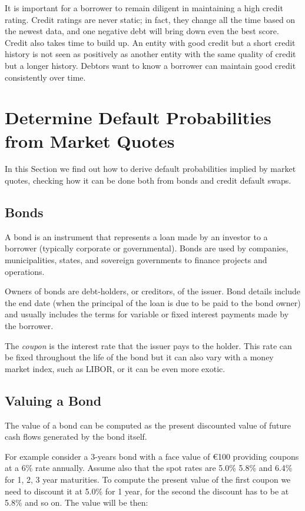 It is important for a borrower to remain diligent in maintaining a high
credit rating. Credit ratings are never static; in fact, they change all
the time based on the newest data, and one negative debt will bring down
even the best score. 
Credit also takes time to build up. An entity with
good credit but a short credit history is not seen as positively as
another entity with the same quality of credit but a longer history.
Debtors want to know a borrower can maintain good credit consistently
over time.

\section{Determine Default Probabilities from Market Quotes}
In this Section we find out how to derive default probabilities implied by market quotes, checking how it can be done both from bonds and credit default swaps.

\subsection{Bonds}\label{bonds}

A bond is an instrument that represents a loan made by an investor to a
borrower (typically corporate or governmental). Bonds are used by
companies, municipalities, states, and sovereign governments to finance
projects and operations. 

Owners of bonds are debt-holders, or creditors,
of the issuer. Bond details include the end date (when the principal of
the loan is due to be paid to the bond owner) and usually includes the
terms for variable or fixed interest payments made by the borrower.

The \emph{coupon} is the interest rate that the issuer pays to the holder.
This rate can be fixed throughout the life of the bond but it can also
vary with a money market index, such as LIBOR, or it can be even more
exotic.

\subsection{Valuing a Bond}\label{sec:bond_pricing}

The value of a bond can be computed as the present discounted value of
future cash flows generated by the bond itself.

For example consider a 3-years bond with a face value of \euro{100}
providing coupons at a 6\% rate annually. Assume also that the spot
rates are 5.0\% 5.8\% and 6.4\% for 1, 2, 3 year maturities. To
compute the present value of the first coupon we need to discount it at
5.0\% for 1 year, for the second the discount has to be at 5.8\% and so
on. The value will be then:

